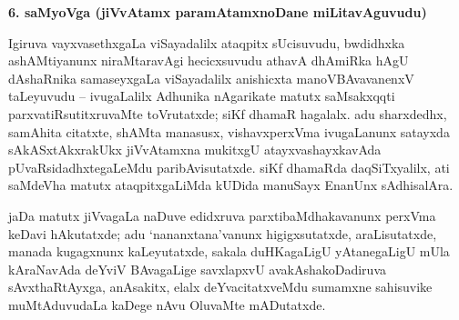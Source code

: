 \bigskip
\begin{center}
{\Large\bf 6. saMyoVga (jiVvAtamx paramAtamxnoDane miLitavAguvudu)}
\end{center}

Igiruva vayxvasethxgaLa viSayadalilx ataqpitx sUcisuvudu, bwdidhxka ashAMtiyanunx niraMtaravAgi hecicxsuvudu athavA dhAmiRka hAgU dAshaRnika samaseyxgaLa viSayadalilx anishicxta manoVBAvavanenxV taLeyuvudu -- ivugaLalilx Adhunika nAgarikate matutx saMsakxqqti parxvatiRsutitxruvaMte toVrutatxde; siKf dhamaR hagalalx. adu sharxdedhx, samAhita citatxte, shAMta manasusx, vishavxperxVma ivugaLanunx satayxda sAkASxtAkxrakUkx jiVvAtamxna mukitxgU atayxvashayxkavAda pUvaRsidadhxtegaLeMdu paribAvisutatxde. siKf dhamaRda daqSiTxyalilx, ati saMdeVha matutx ataqpitxgaLiMda kUDida manuSayx EnanUnx sAdhisalAra.

jaDa matutx jiVvagaLa naDuve edidxruva parxtibaMdhakavanunx perxVma keDavi hAkutatxde; adu `nananxtana'vanunx higigxsutatxde, araLisutatxde, manada kugagxnunx kaLeyutatxde, sakala duHKagaLigU yAtanegaLigU mUla kAraNavAda deYviV BAvagaLige savxlapxvU avakAshakoDadiruva sAvxthaRtAyxga, anAsakitx, elalx deYvacitatxveMdu sumamxne sahisuvike muMtAduvudaLa kaDege nAvu OluvaMte mADutatxde.

